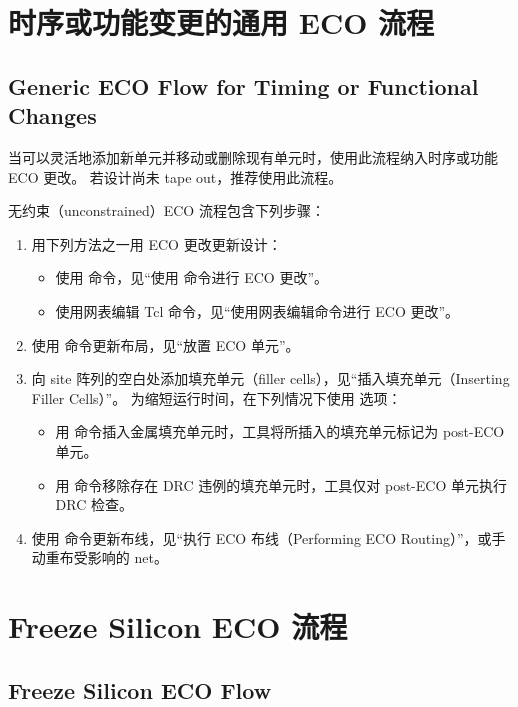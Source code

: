 \section{时序或功能变更的通用 ECO 流程}
\subsection*{Generic ECO Flow for Timing or Functional Changes}

当可以灵活地添加新单元并移动或删除现有单元时，使用此流程纳入时序或功能 ECO 更改。
若设计尚未 tape out，推荐使用此流程。

无约束（unconstrained）ECO 流程包含下列步骤：
\begin{enumerate}
  \item 用下列方法之一用 ECO 更改更新设计：
  \begin{itemize}
    \item 使用  命令，见``使用  命令进行 ECO 更改''。
    \item 使用网表编辑 Tcl 命令，见``使用网表编辑命令进行 ECO 更改''。
  \end{itemize}
  \item 使用  命令更新布局，见``放置 ECO 单元''。
  \item 向 site 阵列的空白处添加填充单元（filler cells），见``插入填充单元（Inserting Filler Cells）''。
  为缩短运行时间，在下列情况下使用  选项：
  \begin{itemize}
    \item 用  命令插入金属填充单元时，工具将所插入的填充单元标记为 post-ECO 单元。
    \item 用  命令移除存在 DRC 违例的填充单元时，工具仅对 post-ECO 单元执行 DRC 检查。
  \end{itemize}
  \item 使用  命令更新布线，见``执行 ECO 布线（Performing ECO Routing）''，或手动重布受影响的 net。
\end{enumerate}

\section{Freeze Silicon ECO 流程}
\subsection*{Freeze Silicon ECO Flow}

